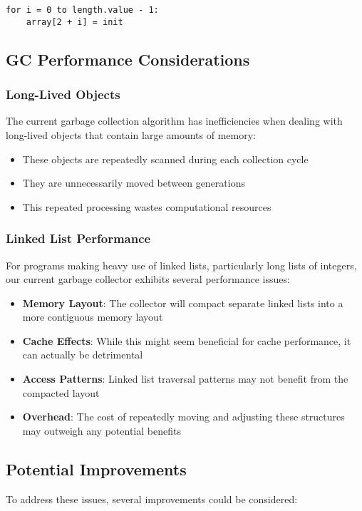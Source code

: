 \documentclass[12pt, a4paper]{article}
\begin{document}
\begin{verbatim}
for i = 0 to length.value - 1:
    array[2 + i] = init
\end{verbatim}

\subsection{GC Performance Considerations}

\subsubsection{Long-Lived Objects}
The current garbage collection algorithm has inefficiencies when dealing with long-lived objects that contain large amounts of memory:

\begin{itemize}
\item These objects are repeatedly scanned during each collection cycle
\item They are unnecessarily moved between generations
\item This repeated processing wastes computational resources
\end{itemize}

\subsubsection{Linked List Performance}
For programs making heavy use of linked lists, particularly long lists of integers, our current garbage collector exhibits several performance issues:

\begin{itemize}
\item \textbf{Memory Layout}: The collector will compact separate linked lists into a more contiguous memory layout
\item \textbf{Cache Effects}: While this might seem beneficial for cache performance, it can actually be detrimental
\item \textbf{Access Patterns}: Linked list traversal patterns may not benefit from the compacted layout
\item \textbf{Overhead}: The cost of repeatedly moving and adjusting these structures may outweigh any potential benefits
\end{itemize}

\subsection{Potential Improvements}
To address these issues, several improvements could be considered:
\end{document}
